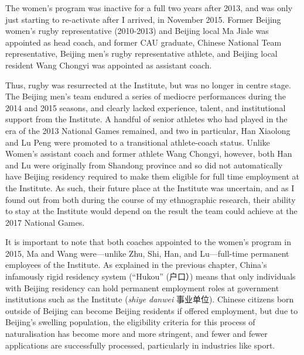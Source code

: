 \begin{CJK}{UTF8}{gbsn}
The women's program was inactive for a full two years after 2013, and was only just starting to re-activate after I arrived, in November 2015.  Former Beijing women's rugby representative (2010-2013) and Beijing local Ma Jiale was appointed as head coach, and former CAU graduate, Chinese National Team representative, Beijing men's rugby representative athlete, and Beijing local resident Wang Chongyi was appointed as assistant coach.

Thus, rugby was resurrected at the Institute, but was no longer in centre stage. The Beijing men's team endured a series of mediocre performances during the 2014 and 2015 seasons, and clearly lacked experience, talent, and institutional support from the Institute.  A handful of senior athletes who had played in the era of the 2013 National Games remained, and two in particular, Han Xiaolong and Lu Peng were promoted to a transitional athlete-coach status. Unlike Women's assistant coach and former athlete Wang Chongyi, however, both Han and Lu were originally from Shandong province and so did not automatically have Beijing residency required to make them eligible for full time employment at the Institute.  As such, their future place at the Institute was uncertain, and as I found out from both during the course of my ethnographic research, their ability to stay at the Institute would depend on the result the team could achieve at the 2017 National Games.

It is important to note that both coaches appointed to the women's program in 2015, Ma and Wang were---unlike Zhu, Shi, Han, and Lu---full-time permanent employees of the Institute. As explained in the previous chapter, China's infamously rigid residency system (``Hukou'' (户口）) means that only individuals with Beijing residency can hold permanent employment roles at government institutions such as the Institute (\textit{shiye danwei} 事业单位).  Chinese citizens born outside of Beijing can become Beijing residents if offered employment, but due to Beijing's swelling population, the eligibility criteria for this process of naturalisation has become more and more stringent, and fewer and fewer applications are successfully processed, particularly in industries like sport.


\end{CJK}
